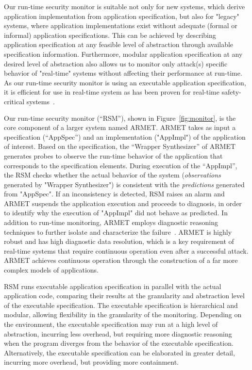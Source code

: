 \documentclass[conference]{IEEEtran}
\begin{document}
Our run-time security monitor is suitable not only for new systems, which derive application implementation from application specification, but also for "legacy" systems, where application implementations exist without adequate (formal or informal) application specifications. This can be achieved by describing application specification at any feasible level of abstraction through available specification information. Furthermore, modular application specification at any desired level of abstraction also allows us to monitor only attack(s) specific behavior of "real-time" systems without affecting their performance at run-time.
As our run-time security monitor is using an executable application specification, it is efficient for use in real-time system as has been proven for real-time safety-critical systems~\cite{Doron:2004}.

Our run-time security monitor (``RSM''), shown in Figure~\ref{fig:monitor}, 
is the core component of a larger system named ARMET. 
ARMET takes as input a specification (``AppSpec'') and an implementation ("AppImpl") of the application of interest.
Based on the specification, the ``Wrapper Synthesizer'' of ARMET generates probes to observe the run-time  behavior of the application that corresponds to the specification elements. During execution of the ``AppImpl'', the RSM checks whether the actual behavior of the system (\emph{observations} generated by "Wrapper Synthesizer") is consistent with the \emph{predictions} generated from "AppSpec". If an inconsistency is detected, RSM raises an alarm and ARMET suspends the application execution and proceeds to diagnosis, in order to identify why the execution of "AppImpl" did not behave as predicted.
In addition to run-time monitoring, ARMET employs diagnostic reasoning techniques to further isolate and characterize the failure~\cite{Shrobe:1979}. ARMET is highly robust and has high diagnostic data resolution, which is a key requirement of real-time systems that require continuous operation even after a successful attack. ARMET achieves continuous operation through the construction of a far more complex models of applications. 









RSM runs executable application specification in parallel with the actual application code, comparing their results at the granularity and abstraction level of the executable specification. The executable specification is hierarchical and modular, allowing flexibility in the granularity of the monitoring. Depending on the environment, the executable specification may run at a high level of abstraction, incurring less overhead, but requiring more diagnostic reasoning when the program diverges from the behavior of the executable specification. Alternatively, the executable specification can be elaborated in greater detail, incurring more overhead, but providing more containment.
\end{document}
